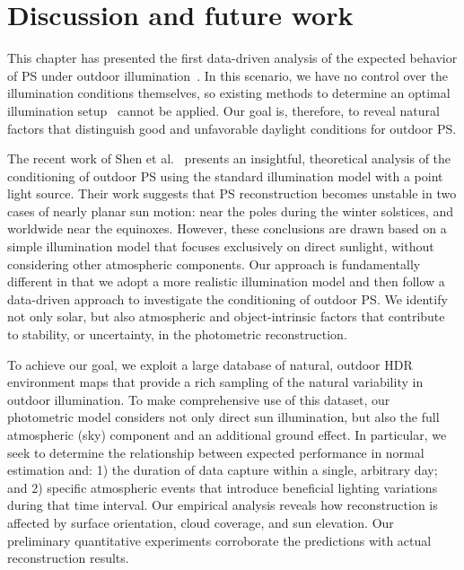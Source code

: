 \section{Discussion and future work}
\label{sec:3dv-discussion}
\label{sec:iccp-discussion}

This chapter has presented the first data-driven analysis of the expected behavior of PS under outdoor illumination~\cite{holdgeoffroy-iccp-15,holdgeoffroy-3dv-15}. In this scenario, we have no control over the illumination conditions themselves, so existing methods to determine an optimal illumination setup~\cite{drbohlav-iccv-05,klaudiny-prl-14} cannot be applied. Our goal is, therefore, to reveal natural factors that distinguish good and unfavorable daylight conditions for outdoor PS.

The recent work of Shen et al.~\cite{shen-pg-14} presents an insightful, theoretical analysis of the conditioning of outdoor PS using the standard illumination model with a point light source. Their work suggests that PS reconstruction becomes unstable in two cases of nearly planar sun motion: near the poles during the winter solstices, and worldwide near the equinoxes. However, these conclusions are drawn based on a simple illumination model that focuses exclusively on direct sunlight, without considering other atmospheric components. Our approach is fundamentally different in that we adopt a more realistic illumination model and then follow a data-driven approach to investigate the conditioning of outdoor PS. We identify not only solar, but also atmospheric and object-intrinsic factors that contribute to stability, or uncertainty, in the photometric reconstruction.


To achieve our goal, we exploit a large database of natural, outdoor HDR environment maps that provide a rich sampling of the natural variability in outdoor illumination. To make comprehensive use of this dataset, our photometric model considers not only direct sun illumination, but also the full atmospheric (sky) component and an additional ground effect. In particular, we seek to determine the relationship between expected performance in normal estimation and: 1) the duration of data capture within a single, arbitrary day; and 2) specific atmospheric events that introduce beneficial lighting variations during that time interval. Our empirical analysis reveals how reconstruction is affected by surface orientation, cloud coverage, and sun elevation. Our preliminary quantitative experiments corroborate the predictions with actual reconstruction results.

